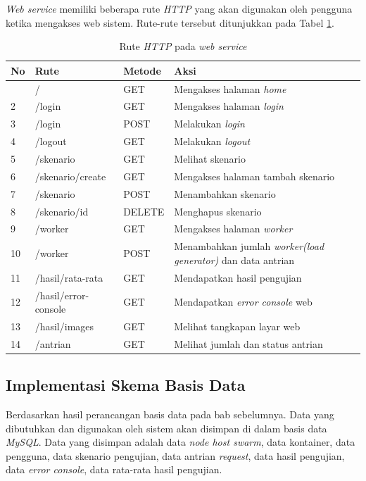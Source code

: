 			\indent \textit{Web service} memiliki beberapa rute \textit{HTTP} yang akan digunakan oleh pengguna ketika mengakses web sistem. Rute-rute tersebut ditunjukkan pada Tabel \ref{tabelruteweb}.
			\begin{longtable}{|p{}|p{}|p{0.30\textwidth}|p{}|}
				\caption{Rute \textit{HTTP} pada \textit{web service}} \label{tabelruteweb} \\ \hline
				\textbf{No} & \textbf{Rute} & \textbf{Metode} & \textbf{Aksi} \\ \hline
				\endhead
				\endfoot
				\endlastfoot
				1 & / & GET & Mengakses halaman \textit{home} \\ \hline
				2 & /login & GET & Mengakses halaman \textit{login} \\ \hline
				3 & /login & POST & Melakukan \textit{login} \\ \hline
				4 & /logout & GET & Melakukan \textit{logout} \\ \hline
				5 & /skenario & GET & Melihat skenario \\ \hline
				6 & /skenario/create & GET & Mengakses halaman tambah skenario \\ \hline
				7 & /skenario & POST & Menambahkan skenario \\ \hline
				8 & /skenario/{id} & DELETE & Menghapus skenario \\ \hline
				9 & /worker & GET & Mengakses halaman \textit{worker} \\ \hline
				10 & /worker & POST & Menambahkan jumlah \textit{worker(load generator)} dan data antrian \\ \hline
				11 & /hasil/rata-rata & GET & Mendapatkan hasil pengujian \\ \hline
				12 & /hasil/error-console & GET & Mendapatkan \textit{error console} web \\ \hline
				13 & /hasil/images & GET & Melihat tangkapan layar web \\ \hline
				14 & /antrian & GET & Melihat jumlah dan status antrian \\ \hline
				
			\end{longtable}
		
		\subsection{Implementasi Skema Basis Data}
			Berdasarkan hasil perancangan basis data pada bab sebelumnya. Data yang dibutuhkan dan digunakan oleh sistem akan disimpan di dalam basis data \textit{MySQL}. Data yang disimpan adalah data \textit{node host swarm}, data kontainer, data pengguna, data skenario pengujian, data antrian \textit{request}, data hasil pengujian, data \textit{error console}, data rata-rata hasil pengujian.
			
